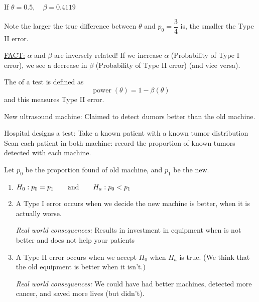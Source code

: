 \nl If $\theta = 0.5, \quad \beta = 0.4119$

\nl Note the larger the true difference between $\theta$ and $p_0 = \dfrac34$ is, the smaller the Type II error.

\nnl \underline{FACT:} $\alpha$ and $\beta$ are inversely related! If we increase $\alpha$ (Probability of Type I error), we see a decrease in $\beta$ (Probability of Type II error) (and vice versa).

 The  of a test is defined as $$\operatorname{power}(\theta) = 1 - \beta(\theta)$$ and this measures Type II error.

\example New ultrasound machine: Claimed to detect dumors better than the old machine.

\nl Hospital designs a test: Take a known patient with a known tumor distribution  Scan each patient in both machine: record the proportion of known tumors detected with each machine.

\nl Let $p_0$ be the proportion found of old machine, and $p_1$ be the new.
\begin{enumerate}[label=(\alph*)]
    \item $H_0 : p_0 = p_1 \qquad \text{and} \qquad H_a : p_0 < p_1$
    \item A Type I error occurs when we decide the new machine is better, when it is actually worse.
    
    \nl \textit{Real world consequences:} Results in investment in  equipment when is not better and does not help your patients

    \item A Type II error occurs when we accept $H_0$ when $H_a$ is true. (We think that the old equipment is better when it isn't.)

    \nl \textit{Real world consequences:} We could have had better machines, detected more cancer, and saved more lives (but didn't).
\end{enumerate}

\noindent 



